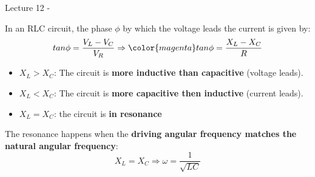 
\renewcommand{\summarizedlecture}{12 }

%
%
%

\begin{frame}{Lecture \summarizedlecture - \lecturesummarytitle}

{\small

In an RLC circuit, the phase $\phi$ by which the voltage leads the current is given by:
\begin{equation*}
     tan\phi = \frac{V_L - V_C}{V_R} \Rightarrow {\color{magenta}  tan\phi = \frac{X_L - X_C}{R} }
\end{equation*}

\begin{itemize}
  \item  {\color{magenta}  $X_L > X_C$}: The circuit is {\bf more inductive than capacitive} (voltage leads).
  \item  {\color{magenta}  $X_L < X_C$}: The circuit is {\bf more capacitive then inductive} (current leads).
  \item  {\color{magenta}  $X_L = X_C$}: the circuit is {\bf in resonance}
\end{itemize}

The resonance happens when the {\bf driving angular frequency matches the natural angular frequency}:
\begin{equation*}
  X_L = X_C \Rightarrow \omega = \frac{1}{\sqrt{LC}}
\end{equation*}

}
\end{frame}
